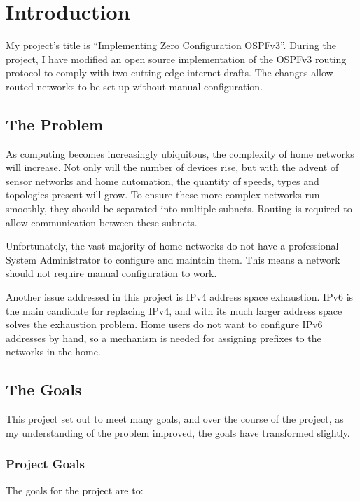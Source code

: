 \chapter{Introduction}
My project's title is ``Implementing Zero Configuration OSPFv3''. During the
project, I have modified an open source implementation of the OSPFv3 routing
protocol to comply with two cutting edge internet drafts. The changes allow
routed networks to be set up without manual configuration.

\section{The Problem}
As computing becomes increasingly ubiquitous, the complexity of home networks
will increase. Not only will the number of devices rise, but with the advent of
sensor networks and home automation, the quantity of speeds, types and
topologies present will grow. To ensure these more complex networks run
smoothly, they should be separated into multiple subnets. Routing is required
to allow communication between these subnets. 

Unfortunately, the vast majority of home networks do not have a professional
System Administrator to configure and maintain them. This means a network
should not require manual configuration to work.

Another issue addressed in this project is IPv4  address space exhaustion. IPv6 is the main candidate for
replacing IPv4, and with its much larger address space solves the exhaustion
problem. Home users do not want to configure IPv6 addresses by hand, so a
mechanism is needed for assigning prefixes to the networks in the home. 

\section{The Goals}
This project set out to meet many goals, and over the course of the project, as
my understanding of the problem improved, the goals have transformed slightly.

\subsection{Project Goals}
The goals for the project are to:

